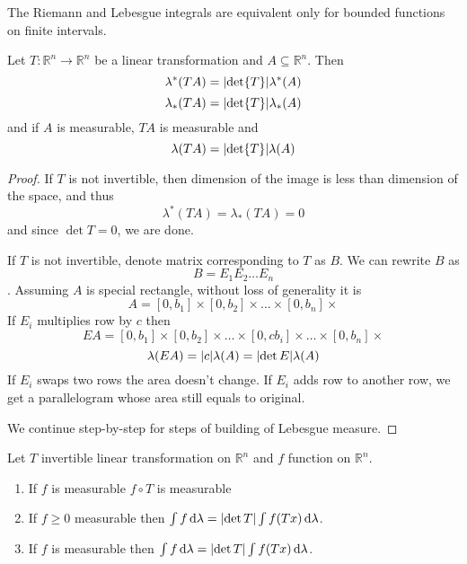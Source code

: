 \begin{prop}
	The Riemann and Lebesgue integrals are equivalent only for bounded functions on finite intervals.
\end{prop}
\begin{theorem}
	Let $T: \mathbb{R}^n \to \mathbb{R}^n$ be a linear transformation and $A\subseteq \mathbb{R}^n$. Then
	$$\lambda^*(TA) = \abs{\det{T}} \lambda^*(A)$$
	$$\lambda_*(TA) = \abs{\det{T}} \lambda_*(A)$$
	and if $A$ is measurable, $TA$ is measurable and
	$$\lambda(TA) = \abs{\det{T}} \lambda(A)$$
	\begin{proof}
		If $T$ is not invertible, then dimension of the image is less than dimension of the space, and thus 
		$$\lambda^*(TA) = \lambda_*(TA) = 0$$
		and since $\det T = 0$, we are done.
		
		
		If $T$ is not invertible, denote matrix corresponding to $T$ as $B$. We can rewrite $B$ as
		$$B=E_1E_2\dots E_n$$. 
		Assuming $A$ is special rectangle, without loss of generality it is
		$$A  =[0,b_1]\times[0,b_2]\times\dots\times [0,b_n]\times$$
		If $E_i$ multiplies row by $c$
		then
		$$EA  =[0,b_1]\times[0,b_2]\times\dots\times[0,cb_i]\times\dots\times [0,b_n]\times$$
		$$\lambda(EA) = \abs{c} \lambda(A) = \abs{\det E}\lambda(A)$$
		If $E_i$ swaps two rows the area doesn't change.
		If $E_i$ adds row to another row, we get a parallelogram whose area still equals to original.
		
		We continue step-by-step for steps of building of Lebesgue measure.
	\end{proof}
\end{theorem}

\begin{theorem}
	Let $T$ invertible linear transformation on $\mathbb{R}^n$ and $f$ function on $\mathbb{R}^n$. 
	\begin{enumerate}
		\item If $f$ is measurable $f\circ T$ is measurable
		\item If $f\geq 0$ measurable then $\int f \dd{\lambda} = \abs{\det T} \int f(Tx) \dd{\lambda}$.
		\item If $f$ is measurable then $\int f \dd{\lambda} = \abs{\det T} \int f(Tx) \dd{\lambda}$.
	\end{enumerate}
\end{theorem}